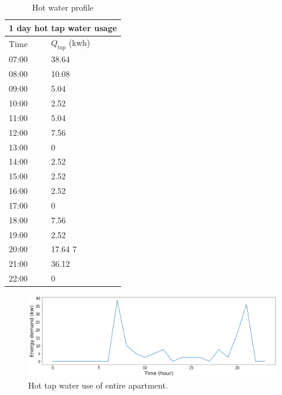 \documentclass[a4paper,10pt]{article}
\begin{document}
\begin{table}[h!]
\centering
\begin{tabular}{|p{3cm}|p{3cm}|}
\hline
\multicolumn{2}{|c|}{1 day hot tap water usage} \\
\hline
Time& $Q_{tap}$ (kwh)\\ %
 \hline
 07:00	& 38.64   \\ %
 08:00  & 10.08   \\ %
 09:00	& 5.04    \\ %
 10:00  & 2.52    \\ %
 11:00  & 5.04    \\ %
 12:00  & 7.56    \\ %
 13:00  & 0         \\ %
 14:00  & 2.52   \\ %
 15:00  & 2.52   \\ %
 16:00  & 2.52   \\ %
 17:00  & 0        \\ %
 18:00  & 7.56   \\ %
 19:00  & 2.52  \\ %
 20:00  & 17.64 7\\ %
 21:00  & 36.12 \\ %
 22:00  & 0        \\ %

  \hline
 \end{tabular}
 \caption{Hot water profile}

 \end{table}


\begin{figure}[H]
\centering
\includegraphics[width=1\columnwidth]{pictures/tap water profile of 24 apartments.png}
\caption[Short title]{Hot tap water use of entire apartment.}
\label{fig:ff11}\end{figure}

\end{document}
